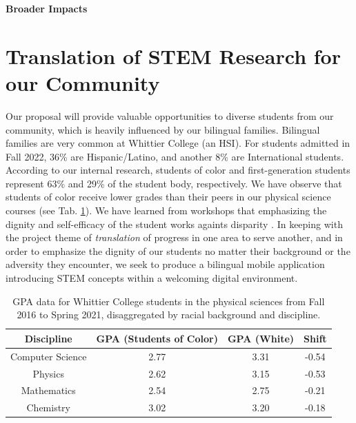 \documentclass[11pt]{amsart}
\begin{document}
\linespacing
\centerline{\bf \Large Broader Impacts}
\linespacing

\section{Translation of STEM Research for our Community}
\label{sec:broad}

Our proposal will provide valuable opportunities to diverse students from our community, which is heavily influenced by our bilingual families.  Bilingual families are very common at Whittier College (an HSI).  For students admitted in Fall 2022, 36\% are Hispanic/Latino, and another 8\% are International students.  According to our internal research, students of color and first-generation students represent 63\% and 29\% of the student body, respectively.  We have observe that students of color receive lower grades than their peers in our physical science courses (see Tab. \ref{tab:grades}).  We have learned from workshops that emphasizing the dignity and self-efficacy of the student works againts disparity \cite{cottrell1,cottrell2}.  In keeping with the project theme of \textit{translation} of progress in one area to serve another, and in order to emphasize the dignity of our students no matter their background or the adversity they encounter, we seek to produce a bilingual mobile application introducing STEM concepts within a welcoming digital environment. 

\begin{table}
\centering
\begin{tabular}{c c c c}
Discipline & GPA (Students of Color) & GPA (White) & Shift \\ \hline
Computer Science & 2.77 & 3.31 & -0.54 \\
Physics & 2.62 & 3.15 & -0.53 \\
Mathematics & 2.54 & 2.75 & -0.21 \\
Chemistry & 3.02 & 3.20 & -0.18 \\
\end{tabular}
\caption{\label{tab:grades} GPA data for Whittier College students in the physical sciences from Fall 2016 to Spring 2021, disaggregated by racial background and discipline.}
\vspace{-0.5cm}
\end{table}
\end{document}
